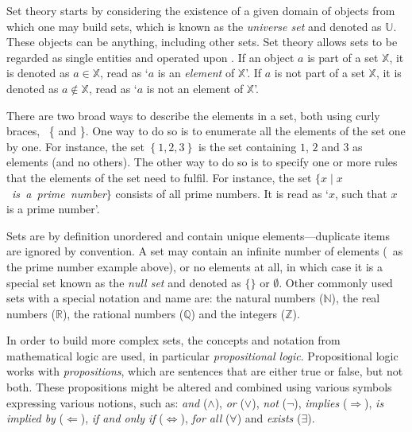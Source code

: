 Set theory starts by considering the existence of a given domain of objects from which one may build sets, which is known as the \emph{universe set} and denoted as $\mathbb{U}$.
These objects can be anything, including other sets.
Set theory allows sets to be regarded as single entities and operated upon \citep{Devlin93}.
If an object $a$ is part of a set $\mathbb{X}$, it is denoted as $a \in \mathbb{X}$, read as `$a$ is an \emph{element} of $\mathbb{X}$'.
If $a$ is not part of a set $\mathbb{X}$, it is denoted as $a \notin \mathbb{X}$, read as `$a$ is not an element of $\mathbb{X}$'.

There are two broad ways to describe the elements in a set, both using curly braces, \ie\ \{ and \}.
One way to do so is to enumerate all the elements of the set one by one.
For instance, the set $\left\{ 1,2,3 \right\}$ is the set containing $1$, $2$ and $3$ as elements (and no others).
The other way to do so is to specify one or more rules that the elements of the set need to fulfil.
For instance, the set $\{ x \mid x$~\emph{is~a~prime~number}$\}$ consists of all prime numbers.
It is read as `$x$, such that $x$ is a prime number'.

Sets are by definition unordered and contain unique elements---duplicate items are ignored by convention.
A set may contain an infinite number of elements (\eg\ as the prime number example above), or no elements at all, in which case it is a special set known as the \emph{null set} and denoted as $\{ \}$ or $\emptyset$.
Other commonly used sets with a special notation and name are: the natural numbers ($\mathbb{N}$), the real numbers ($\mathbb{R}$), the rational numbers ($\mathbb{Q}$) and the integers ($\mathbb{Z}$).

In order to build more complex sets, the concepts and notation from mathematical logic are used, in particular \emph{propositional logic}.
Propositional logic works with \emph{propositions}, which are sentences that are either true or false, but not both.
These propositions might be altered and combined using various symbols expressing various notions, such as: \emph{and} ($\wedge$), \emph{or} ($\vee$), \emph{not} ($\neg$), \emph{implies} ($\Rightarrow$), \emph{is implied by} ($\Leftarrow$), \emph{if and only if} ($\Leftrightarrow$), \emph{for all} ($\forall$) and \emph{exists} ($\exists$).

